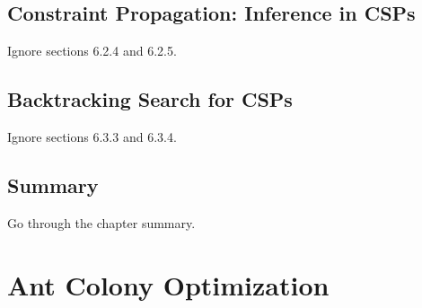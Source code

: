 \documentclass[exam={Midterm},color=true]{cs581exam}
\begin{document}
\subsection{Constraint Propagation: Inference in CSPs}\label{subsec:6.2}
Ignore sections 6.2.4 and 6.2.5.
\subsection{Backtracking Search for CSPs}\label{subsec:6.3}
Ignore sections 6.3.3 and 6.3.4.
\subsection{Summary}\label{subsec:6-summary}
Go through the chapter summary.

\section{Ant Colony Optimization}\label{sec:ant-colony-optimization}
\end{document}
